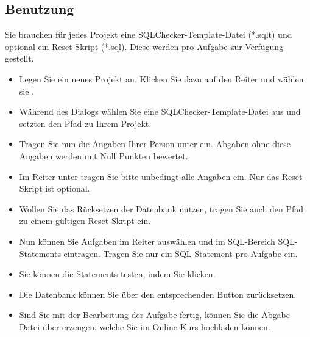 \documentclass[11pt]{article}
\begin{document}
\subsection{Benutzung}
Sie brauchen für jedes Projekt eine SQLChecker-Template-Datei (*.sqlt) und optional ein Reset-Skript (*.sql). Diese werden pro Aufgabe zur Verfügung gestellt.
\begin{itemize}
	\item Legen Sie ein neues Projekt an. Klicken Sie dazu auf den Reiter  und wählen sie .
	\item Während des Dialogs wählen Sie eine SQLChecker-Template-Datei aus und setzten den Pfad zu Ihrem Projekt.
	\item Tragen Sie nun die Angaben Ihrer Person unter  ein. Abgaben ohne diese Angaben werden mit Null Punkten bewertet.
	\item Im Reiter  unter  tragen Sie bitte unbedingt alle Angaben ein. Nur das Reset-Skript ist optional.
	\item Wollen Sie das Rücksetzen der Datenbank nutzen, tragen Sie auch den Pfad zu einem gültigen Reset-Skript ein.
	\item Nun können Sie Aufgaben im Reiter  auswählen und im SQL-Bereich SQL-Statements eintragen. Tragen Sie nur \underline{ein} SQL-Statement pro Aufgabe ein.
	\item Sie können die Statements testen, indem Sie  klicken.
	\item Die Datenbank können Sie über den entsprechenden Button zurücksetzen.
\item Sind Sie mit der Bearbeitung der Aufgabe fertig, können Sie die Abgabe-Datei über  erzeugen, welche Sie im Online-Kurs hochladen können.
\end{itemize}
\end{document}
